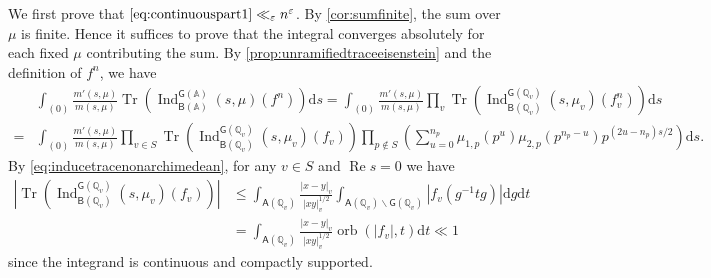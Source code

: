 \documentclass[10pt,oneside,reqno]{amsart}
\makeatletter
\newcommand\rmd{\mathrm{d}}
\renewcommand\AA{\mathbb{A}}
\newcommand\QQ{\mathbb{Q}}
\newcommand\A{\mathsf{A}}
\newcommand\B{\mathsf{B}}
\newcommand\G{\mathsf{G}}
\newcommand\bs{\backslash}
\renewcommand\Re{\mathop{\mathrm{Re}}}
\DeclareMathOperator\Tr{Tr}
\DeclareMathOperator\Ind{Ind}
\DeclareMathOperator\orb{orb}
\renewcommand\leq{\leqslant}
\theoremstyle{THEOREM}
\theoremstyle{DEFINITION}
\theoremstyle{EXERCISE}
\numberwithin{equation}{section}
\renewenvironment{proof}[1][\proofname]{\par
  \vspace{-6pt}
  \pushQED{\qed}
  \normalfont \topsep6\p@\@plus6\p@\relax
  \trivlist
  \item[\hskip\labelsep\rmfamily\bfseries
    #1\@addpunct{:}]\ignorespaces
}{
  \popQED\endtrivlist\@endpefalse
  \vspace{-6pt}
}
\makeatother
\begin{document}
\begin{proof}[Proof of \autoref{prop:continuouspart}]
We first prove that $\eqref{eq:continuouspart1}\ll_\varepsilon n^\varepsilon$.
By \autoref{cor:sumfinite}, the sum over $\mu$ is finite. Hence it suffices to prove that the integral converges absolutely for each fixed $\mu$ contributing the sum. By \autoref{prop:unramifiedtraceeisenstein} and the definition of $f^n$, we have
\begin{align*}
  &\int_{(0)}\frac{m'(s,\mu)}{m(s,\mu)}\Tr\left(\Ind_{\B(\AA)}^{\G(\AA)}(s,\mu)(f^n)\right)\rmd s 
   = \int_{(0)}\frac{m'(s,\mu)}{m(s,\mu)} \prod_{v}\Tr\left(\Ind_{\B(\QQ_v)}^{\G(\QQ_v)}(s,\mu_v)(f^n_v)\right)\rmd s\\
    =&\int_{(0)}\frac{m'(s,\mu)}{m(s,\mu)} \prod_{v\in S}\Tr\left(\Ind_{\B(\QQ_v)}^{\G(\QQ_v)}(s,\mu_v)(f_v)\right)\prod_{p\notin S}\left(\sum_{u=0}^{n_p}\mu_{1,p}(p^u)\mu_{2,p}(p^{n_p-u}) p^{(2u-n_p)s/2}\right)\rmd s.
\end{align*}
By \eqref{eq:inducetracenonarchimedean}, for any $v\in S$ and $\Re s=0$ we have
\begin{align*}
\left|\Tr\left(\Ind_{\B(\QQ_v)}^{\G(\QQ_v)}(s,\mu_v)(f_v)\right)\right|&\leq\int_{ \A(\QQ_v)}\frac{|x-y|_v}{|xy|_v^{1/2}}\int_{\A(\QQ_v)\bs \G(\QQ_v)}|f_v(g^{-1}tg)|\rmd g \rmd t\\
&=\int_{ \A(\QQ_v)}\frac{|x-y|_v}{|xy|_v^{1/2}}\orb(|f_v|,t)\rmd t\ll 1
\end{align*}
since the integrand is continuous and compactly supported. 


\end{proof}
\end{document}
